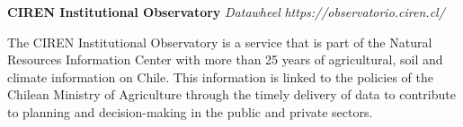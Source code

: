 \item
\headerrow
{\textbf{CIREN Institutional Observatory}}
{\emph{}}
\headerrow
{\emph{Datawheel}}
{\emph{https://observatorio.ciren.cl/}}
\begin{itemize*}
    \item The CIREN Institutional Observatory is a service that is part of the 
    Natural Resources Information Center with more than 25 years of agricultural, 
    soil and climate information on Chile. This information is linked to the 
    policies of the Chilean Ministry of Agriculture through the timely delivery of 
    data to contribute to planning and decision-making in the public and private sectors.
\end{itemize*}